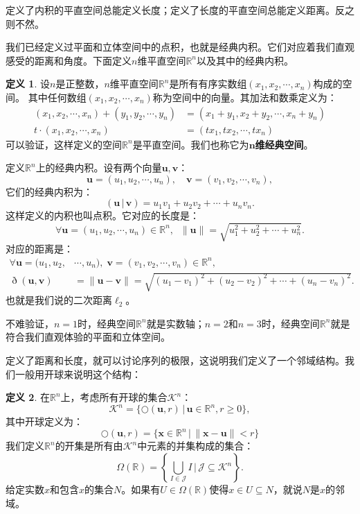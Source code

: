 \documentclass[12pt,UTF8]{ctexbook}
\newcommand{\nji}[2]{\displaystyle\left( #1 \,|\, #2\right)}
\theoremstyle{definition}
\newtheorem{df}{定义}[section]
\theoremstyle{plain}
\begin{document}
\begin{appendix}
定义了内积的平直空间总能定义长度；定义了长度的平直空间总能定义距离。反之则不然。

我们已经定义过平面和立体空间中的点积，也就是经典内积。它们对应着我们直观感受的距离和角度。下面定义$n$维平直空间$\mathbb{R}^n$以及其中的经典内积。
\begin{df}
    设$n$是正整数，$n$维平直空间$\mathbb{R}^n$是所有有序实数组$(x_1, x_2, \cdots, x_n)$构成的空间。
    其中任何数组$(x_1, x_2, \cdots, x_n)$称为空间中的向量。其加法和数乘定义为：
    \begin{align*}
        (x_1, x_2, \cdots, x_n) + (y_1, y_2, \cdots, y_n) &= (x_1 + y_1, x_2 + y_2, \cdots, x_n + y_n) \\
        t\cdot (x_1, x_2, \cdots, x_n) &= (tx_1, tx_2, \cdots, t x_n)
    \end{align*}
    可以验证，这样定义的空间$\mathbb{R}^n$是平直空间。我们也称它为$\boldsymbol{n}$\textbf{维经典空间}。

    定义$\mathbb{R}^n$上的经典内积。设有两个向量$\mathbf{u}, \mathbf{v}$：
    $$ \mathbf{u} = (u_1, u_2, \cdots, u_n), \quad  \mathbf{v} = (v_1, v_2, \cdots, v_n), $$
    它们的经典内积为：
    $$ \nji{\mathbf{u}}{\mathbf{v}} = u_1v_1 + u_2v_2 + \cdots + u_n v_n.$$
    这样定义的内积也叫点积。它对应的长度是：
    $$ \forall \mathbf{u} = (u_1, u_2, \cdots, u_n) \in \mathbb{R}^n, \;\; \| \mathbf{u}\| = \sqrt{u_1^2 + u_2^2 + \cdots + u_n^2} .$$
    对应的距离是：
    \begin{align*}
        \forall \mathbf{u} = (u_1, u_2, &\cdots, u_n), \; \mathbf{v} = (v_1, v_2, \cdots, v_n) \in \mathbb{R}^n, \\
        \eth(\mathbf{u}, \mathbf{v}) &= \| \mathbf{u} - \mathbf{v}\| = \sqrt{(u_1 - v_1)^2 + (u_2 - v_2)^2 + \cdots + (u_n - v_n)^2} .
    \end{align*}
    也就是我们说的二次距离$\ell_2$。
\end{df}
不难验证，$n=1$时，经典空间$\mathbb{R}^n$就是实数轴；$n=2$和$n=3$时，经典空间$\mathbb{R}^n$就是符合我们直观体验的平面和立体空间。

定义了距离和长度，就可以讨论序列的极限，这说明我们定义了一个邻域结构。我们一般用开球来说明这个结构：
\begin{df}
    在$\mathbb{R}^n$上，考虑所有开球的集合$\mathcal{K}^n$：
    $$ \mathcal{K}^n = \{ \bigcirc(\mathbf{u}, r) \, | \, \mathbf{u} \in \mathbb{R}^n, r \geqslant 0 \},$$
    其中开球定义为：
    $$ \bigcirc(\mathbf{u},r) = \{ \mathbf{x}\in \mathbb{R}^n\,|\, \| \mathbf{x} - \mathbf{u}\| < r\} $$
    我们定义$\mathbb{R}^n$的开集是所有由$\mathcal{K}^n$中元素的并集构成的集合：
    $$ \Omega(\mathbb{R}) = \left\{\bigcup_{I \in \mathcal{J}} I \, \Bigg| \,\mathcal{J} \subseteq  \mathcal{K}^n \right\}.$$
    给定实数$x$和包含$x$的集合$N$。如果有$U\in\Omega(\mathbb{R})$使得$x\in U\subseteq N$，就说$N$是$x$的邻域。


\end{df}
\end{appendix}
\end{document}
